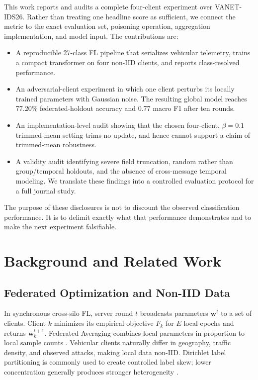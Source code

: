 \documentclass[journal]{IEEEtran}
\begin{document}
This work reports and audits a complete four-client experiment over VANET-IDS26. Rather than treating one headline score as sufficient, we connect the metric to the exact evaluation set, poisoning operation, aggregation implementation, and model input. The contributions are:
\begin{itemize}
    \item A reproducible 27-class FL pipeline that serializes vehicular telemetry, trains a compact transformer on four non-IID clients, and reports class-resolved performance.
    \item An adversarial-client experiment in which one client perturbs its locally trained parameters with Gaussian noise. The resulting global model reaches 77.20\% federated-holdout accuracy and 0.77 macro F1 after ten rounds.
    \item An implementation-level audit showing that the chosen four-client, $\beta=0.1$ trimmed-mean setting trims no update, and hence cannot support a claim of trimmed-mean robustness.
    \item A validity audit identifying severe field truncation, random rather than group/temporal holdouts, and the absence of cross-message temporal modeling. We translate these findings into a controlled evaluation protocol for a full journal study.
\end{itemize}

The purpose of these disclosures is not to discount the observed classification performance. It is to delimit exactly what that performance demonstrates and to make the next experiment falsifiable.

\section{Background and Related Work}

\subsection{Federated Optimization and Non-IID Data}
In synchronous cross-silo FL, server round $t$ broadcasts parameters $\mathbf{w}^{t}$ to a set of clients. Client $k$ minimizes its empirical objective $F_k$ for $E$ local epochs and returns $\mathbf{w}^{t+1}_k$. Federated Averaging combines local parameters in proportion to local sample counts \cite{mcmahan2017communication}. Vehicular clients naturally differ in geography, traffic density, and observed attacks, making local data non-IID. Dirichlet label partitioning is commonly used to create controlled label skew; lower concentration generally produces stronger heterogeneity \cite{li2022federated}.
\end{document}
